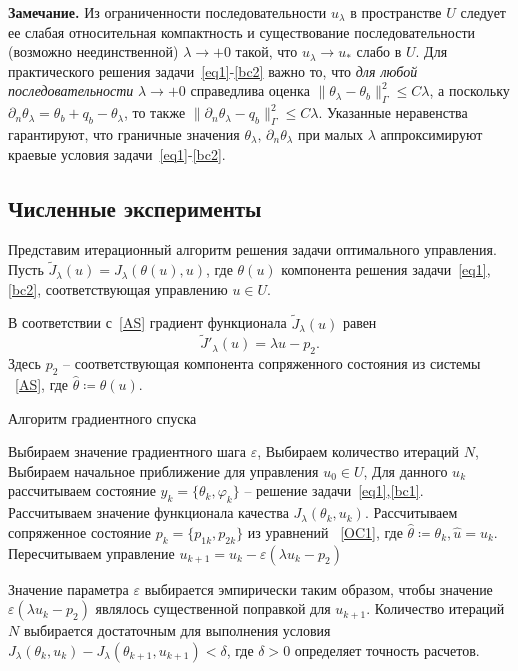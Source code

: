 \textbf{Замечание.} Из ограниченности последовательности $u_\lambda$ в пространстве $U$ следует
ее слабая относительная компактность и существование последовательности (возможно неединственной) $\lambda\to+0$ такой, что
$u_\lambda \rightarrow u_*$ слабо в $U$.
Для практического решения задачи~\eqref{eq1}-\eqref{bc2} важно то, что \textit{для любой последовательности}
$\lambda\to+0$ справедлива оценка
$\|\theta_\lambda -\theta_b\|^2_\Gamma\leq C\lambda$, а поскольку $\partial_n\theta_\lambda=\theta_b+q_b-\theta_\lambda$, то также $\|\partial_n\theta_\lambda-q_b\|^2_\Gamma\leq C\lambda$.
Указанные неравенства гарантируют, что граничные значения $\theta_\lambda,\,\partial_n\theta_\lambda$
при малых $\lambda$
аппроксимируют краевые условия задачи~\eqref{eq1}-\eqref{bc2}.

\subsection{Численные эксперименты}

Представим итерационный алгоритм решения задачи оптимального управления.
Пусть $\tilde J_\lambda(u)=J_\lambda(\theta(u), u)$, где $\theta(u)$ компонента решения
задачи~\eqref{eq1},\eqref{bc2}, соответствующая управлению $u\in U$.

В соответствии с~\eqref{AS} градиент функционала $\tilde J_\lambda(u)$ равен
\[ \tilde J'_\lambda (u) = \lambda u - p_2. \]
Здесь $p_2$ -- соответствующая компонента сопряженного состояния из системы ~\eqref{AS},
где $\hat{\theta}\coloneqq\theta(u)$.

\begin{algorithm}[H]
    \caption{Алгоритм градиентного спуска}
    \label{alg:algorithm}
    \begin{algorithmic}[1]
        \State Выбираем значение градиентного шага $\varepsilon$,
        \State Выбираем количество итераций $N$,
        \State Выбираем начальное приближение для управления $u_0 \in U$,
            \State Для данного $u_k$ рассчитываем состояние $y_k = \{\theta_k, \varphi_k\}$ --
            решение задачи~\eqref{eq1},\eqref{bc1}.
            \State Рассчитываем значение функционала качества $J_\lambda(\theta_k, u_k)$.
            \State Рассчитываем сопряженное состояние $p_k=\{p_{1k},p_{2k}\}$ из уравнений ~\eqref{OC1},
            где $ \hat{\theta} \coloneqq \theta_k, \hat{u}=u_k$.
            \State Пересчитываем управление $u_{k+1} = u_k - \varepsilon (\lambda u_k - p_2)$
        \EndFor
    \end{algorithmic}
\end{algorithm}
Значение параметра $\varepsilon$ выбирается эмпирически таким образом, чтобы значение
$\varepsilon (\lambda u_k - p_2)$ являлось существенной поправкой для $u_{k+1}$.
Количество итераций $N$ выбирается достаточным для выполнения условия
$J_\lambda(\theta_k, u_k) - J_\lambda(\theta_{k+1}, u_{k+1}) < \delta$, где $\delta>0$
определяет точность расчетов.

